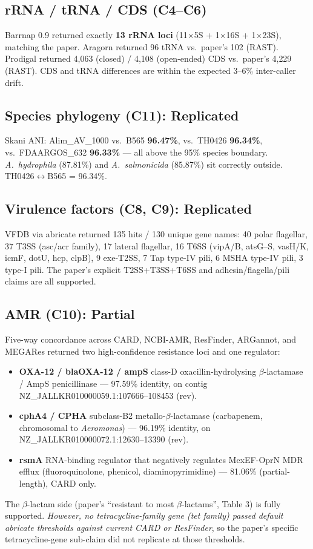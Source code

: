 \documentclass[11pt,letterpaper]{article}
\begin{document}
\subsection{rRNA / tRNA / CDS (C4--C6)}
Barrnap 0.9 returned exactly \textbf{13 rRNA loci} (11$\times$5S + 1$\times$16S + 1$\times$23S), matching the paper. Aragorn returned 96 tRNA vs.\ paper's 102 (RAST). Prodigal returned 4{,}063 (closed) / 4{,}108 (open-ended) CDS vs.\ paper's 4{,}229 (RAST). CDS and tRNA differences are within the expected 3--6\% inter-caller drift.

\subsection{Species phylogeny (C11): Replicated}
Skani ANI: Alim\_AV\_1000 vs.\ B565 \textbf{96.47\%}, vs.\ TH0426 \textbf{96.34\%}, vs.\ FDAARGOS\_632 \textbf{96.33\%} --- all above the 95\% species boundary. \textit{A.\ hydrophila} (87.81\%) and \textit{A.\ salmonicida} (85.87\%) sit correctly outside. TH0426$\leftrightarrow$B565 = 96.34\%.

\subsection{Virulence factors (C8, C9): Replicated}
VFDB via abricate returned 135 hits / 130 unique gene names: 40 polar flagellar, 37 T3SS (asc/acr family), 17 lateral flagellar, 16 T6SS (vipA/B, atsG--S, vasH/K, icmF, dotU, hcp, clpB), 9 exe-T2SS, 7 Tap type-IV pili, 6 MSHA type-IV pili, 3 type-I pili. The paper's explicit T2SS+T3SS+T6SS and adhesin/flagella/pili claims are all supported.

\subsection{AMR (C10): Partial}
Five-way concordance across CARD, NCBI-AMR, ResFinder, ARGannot, and MEGARes returned two high-confidence resistance loci and one regulator:
\begin{itemize}
  \item \textbf{OXA-12 / blaOXA-12 / ampS} class-D oxacillin-hydrolysing $\beta$-lactamase / AmpS penicillinase --- 97.59\% identity, on contig NZ\_JALLKR010000059.1:107666--108453 (rev).
  \item \textbf{cphA4 / CPHA} subclass-B2 metallo-$\beta$-lactamase (carbapenem, chromosomal to \textit{Aeromonas}) --- 96.19\% identity, on NZ\_JALLKR010000072.1:12630--13390 (rev).
  \item \textbf{rsmA} RNA-binding regulator that negatively regulates MexEF-OprN MDR efflux (fluoroquinolone, phenicol, diaminopyrimidine) --- 81.06\% (partial-length), CARD only.
\end{itemize}
The $\beta$-lactam side (paper's ``resistant to most $\beta$-lactams'', Table 3) is fully supported. \emph{However, no tetracycline-family gene (tet family) passed default abricate thresholds against current CARD or ResFinder}, so the paper's specific tetracycline-gene sub-claim did not replicate at those thresholds.
\end{document}
